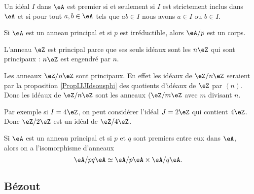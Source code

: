 \begin{proposition}
    Un idéal \( I\) dans \( \eA\) est premier si et seulement si \( I\) est strictement inclus dans \( \eA\) et si pour tout \( a,b\in\eA\) tels que \( ab\in I\) nous avons \( a\in I\) ou \( b\in I\).
\end{proposition}

\begin{proposition}     \label{PropoTMMXCx}
    Si \( \eA\) est un anneau principal et si \( p\) est irréductible, alors \( \eA/p\) est un corps.
\end{proposition}

\begin{example}
    L'anneau \( \eZ\) est principal parce que ses seuls idéaux sont les \( n\eZ\) qui sont principaux : \( n\eZ\) est engendré par \( n\).
\end{example}

\begin{example}
    Les anneaux \( \eZ/n\eZ\) sont principaux. En effet les idéaux de \( \eZ/n\eZ\) seraient par la proposition \ref{PropIJJIdsousphi} des quotients d'idéaux de \( \eZ\) par \( (n)\). Donc les idéaux de \( \eZ/n\eZ\) sont les anneaux \( (\eZ/m\eZ\) avec \( m\) divisant \( n\).

    Par exemple si \( I=4\eZ\), on peut considérer l'idéal \( J=2\eZ\) qui contient \( 4\eZ\). Donc \( \eZ/2\eZ\) est un idéal de \( \eZ/4\eZ\).
\end{example}

\begin{theorem}        \label{ThofPXwiM}
    Si \( \eA\) est un anneau principal et si \( p\) et \( q\) sont premiers entre eux dans \( \eA\), alors on a l'isomorphisme d'anneaux
    \begin{equation}
        \eA/pq\eA\simeq \eA/p\eA\times \eA/q\eA.
    \end{equation}
\end{theorem}

\subsection{Bézout}

